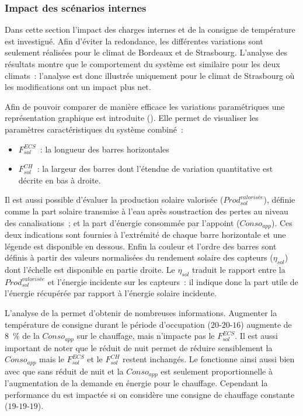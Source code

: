 \subsubsection{Impact des scénarios internes} %
\label{ssub:impact_des_scenarios_internes}
Dans cette section l’impact des charges internes et de la consigne de température est
investigué. Afin d’éviter la redondance, les différentes variations sont seulement
réalisées pour le climat de Bordeaux et de Strasbourg. L’analyse des résultats montre
que le comportement du système est similaire pour les deux climats~: l’analyse est donc
illustrée uniquement pour le climat de Strasbourg où les modifications ont un impact plus
net.

Afin de pouvoir comparer de manière efficace les variations paramétriques une
représentation graphique est introduite (). Elle permet
de visualiser les paramètres caractéristiques du système combiné~:
\begin{itemize}
    \item $F_{sol}^{ECS}$~: la longueur des barres horizontales
    \item $F_{sol}^{CH}$~: la largeur des barres dont l’étendue de variation quantitative
          est décrite en bas à droite.
\end{itemize}
Il est aussi possible d’évaluer la production solaire valorisée
($Prod_{sol}^{valorisée}$), définie comme la part solaire transmise à l’eau après
soustraction des pertes au niveau des canalisations~; et la part d’énergie consommée
par l’appoint ($Conso_{app}$). Ces deux indications sont fournies à l’extrémité de chaque
barre horizontale et une légende est disponible en dessous.
Enfin la couleur et l’ordre des barres sont définis à partir des valeurs normalisées
du rendement solaire des capteurs ($\eta_{sol}$) dont l’échelle est disponible en partie droite. Le
$\eta_{sol}$ traduit le rapport entre la $Prod_{sol}^{valorisée}$ et l’énergie
incidente sur les capteurs~: il indique donc la part utile de l’énergie récupérée par rapport à
l’énergie solaire incidente.

L’analyse de la  permet d’obtenir de nombreuses
informations. Augmenter la température de consigne durant le période
d’occupation ($20$-$20$-$16$) augmente de \SI{8}{\percent} de la $Conso_{app}$
sur le chauffage, mais n’impacte pas le $F_{sol}^{ECS}$. Il est aussi important de noter que le
réduit de nuit permet de réduire sensiblement la $Conso_{app}$ mais le $F_{sol}^{ECS}$ et le
$F_{sol}^{CH}$ restent inchangés. Le  fonctionne ainsi aussi bien avec que sans réduit de
nuit et la $Conso_{app}$ est seulement proportionnelle à l’augmentation de la demande en
énergie pour le chauffage. Cependant la performance du  est impactée si on considère
une consigne de chauffage constante ($19$-$19$-$19$).


